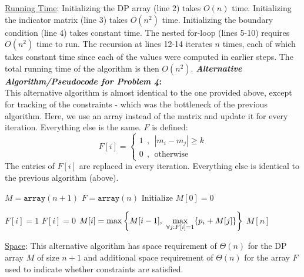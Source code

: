 \documentclass[twoside,11pt]{homework}
\newcommand\NoProc{\renewcommand\algorithmicprocedure{}}
\begin{document}
\noindent
\underline{Running Time}: Initializing the DP array (line 2) takes $O(n)$ time.  Initializing the indicator matrix (line 3) takes $O(n^2)$ time.  Initializing the boundary condition (line 4) takes constant time. The nested for-loop (lines 5-10) requires $O(n^2)$ time to run.   The recursion at lines 12-14 iterates $n$ times, each of which takes constant time since each of the values were computed in earlier steps.   The total running time of the algorithm is then $O(n^2)$. 
\newpage
\noindent
\textbf{\textit{Alternative Algorithm/Pseudocode for Problem 4}:} \\
This alternative algorithm is almost identical to the one provided above, except for tracking of the constraints - which was the bottleneck  of the previous algorithm.  Here, we use an array instead of the matrix and update it for every iteration.  Everything else is the same.  $F$ is defined: 
$$F[i] = 
\begin{cases} 
1 \ \ , \ \ |m_i - m_j| \geq k \\
0 \ \ ,  \ \ \text{otherwise}
\end{cases}
$$
The entries of $F[i]$ are replaced in every iteration.  Everything else is identical to the previous algorithm (above). 

\begin{algorithm}[H]
\begin{algorithmic}[1]
\NoProc
{}
\State $M = \texttt{array}(n+1)$    
\State $F = \texttt{array}(n)$    
\State Initialize $M[0] = 0$    

    
\State $F[i] = 1$
\Else  
\State $F[i] = 0$
\EndIf
\State $\mathlarger{M[i] = \max \left\lbrace M[i-1], \ \max_{\forall j : F[i]=1} \{p_i + M[j]\} \right\rbrace }$
\EndFor
\State \Return $M[n]$
\EndProcedure
\end{algorithmic}
\end{algorithm}

\noindent
\underline{Space}: This alternative algorithm has space requirement of $\Theta(n)$ for the DP array $M$ of size $n+1$ and additional space requirement of $\Theta(n)$ for the array $F$ used to indicate whether constraints are satisfied.   \\
\end{document}

